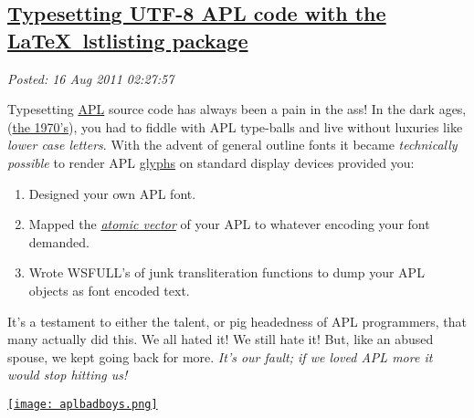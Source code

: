 %

\subsection*{\href{https://bakerjd99.wordpress.com/2011/08/15/typesetting-utf8-apl-code-with-the-latex-lstlisting-package/}{Typesetting UTF-8 APL code with the \LaTeX\ lstlisting package}}


\noindent\emph{Posted: 16 Aug 2011 02:27:57}
\vspace{6pt}


%
Typesetting
\href{http://en.wikipedia.org/wiki/APL\_(programming\_language)}{APL}
source code has always been a pain in the ass! In the dark ages,
(\href{http://www.google.com/search?tbm=isch\&hl=en\&source=hp\&biw=994\&bih=584\&q=the+seventies\&gbv=2\&oq=the+seventi}{the
1970's}), you had to fiddle with APL type-balls and live without
luxuries like \emph{lower case letters}. With the advent of general
outline fonts it became \emph{technically possible} to render APL
\href{http://www.merriam-webster.com/dictionary/glyph}{glyphs} on
standard display devices provided you:

\begin{enumerate}
\item
  Designed your own APL font.
\item
  Mapped the \emph{\href{http://aplwiki.com/AtomicVector}{atomic
  vector}} of your APL to whatever encoding your font demanded.
\item
  Wrote WSFULL's of junk transliteration functions to dump your APL
  objects as font encoded text.
\end{enumerate}
It's a testament to either the talent, or pig headedness of APL
programmers, that many actually did this. We all hated it! We still hate
it! But, like an abused spouse, we kept going back for more. \emph{It's
our fault; if we loved APL more it would stop hitting us!}

\captionsetup[figure]{labelformat=empty}
\begin{SCfigure}
  \centering
\href{http://www.box.net/shared/62x2208x56lrjy5vkesz}{\texttt{[image: aplbadboys.png]}}
\caption{UTF-8 APL characters within a \LaTeX\ \texttt{lstlisting} environment. Click for \texttt{*.tex} source  code.}
\label{fig:1837X0}
\end{SCfigure}

